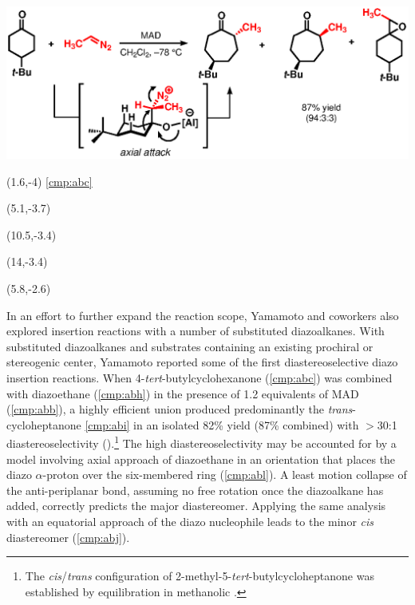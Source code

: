 \begin{Scheme}[t]
  \centering \includegraphics[scale=0.8]{chp_diazobkg/images/yamamotodiastereo}
  \caption{Diastereoselective insertion of diazoethane into 4-\textit{tert}-butylcyclohexanone.}
  \begin{textblock}{1}(1.6,-4) \textsf{\scriptsize{\ref{cmp:abc}}}
\end{textblock}
  \begin{textblock}{1}(5.1,-3.7)  \end{textblock}
  \begin{textblock}{1}(10.5,-3.4)  \end{textblock}
  \begin{textblock}{1}(14,-3.4)  \end{textblock}
  \begin{textblock}{1}(5.8,-2.6)  \end{textblock}
  \label{sch:yamamotodiastereo}
\end{Scheme}
In an effort to further expand the reaction scope, Yamamoto and coworkers also explored
insertion reactions with a number of substituted diazoalkanes. With substituted diazoalkanes
and substrates containing an existing prochiral or stereogenic center, Yamamoto reported
some of the first diastereoselective diazo insertion reactions. When 4-\textit{tert}-butylcyclohexanone
(\ref{cmp:abc}) was combined with diazoethane (\ref{cmp:abh}) in the presence of 1.2 equivalents of
MAD (\ref{cmp:abb}), a highly efficient union produced predominantly the \textit{trans}-cycloheptanone
\ref{cmp:abi} in an isolated 82\% yield (87\% combined) with $>$30:1 diastereoselectivity
().\footnote{The \textit{cis}/\textit{trans} configuration of 2-methyl-5-\textit{tert}-butylcycloheptanone was established by equilibration in methanolic
.} The high diastereoselectivity may be accounted for by a model involving axial approach
of diazoethane in an orientation that places the diazo $\alpha$-proton over the six-membered ring
(\ref{cmp:abl}). A least motion collapse of the anti-periplanar  bond, assuming no free
rotation once the diazoalkane has added, correctly predicts the major diastereomer. Applying the same analysis with an equatorial approach of the diazo
nucleophile leads to the minor \textit{cis} diastereomer (\ce{->}\ref{cmp:abj}). 


